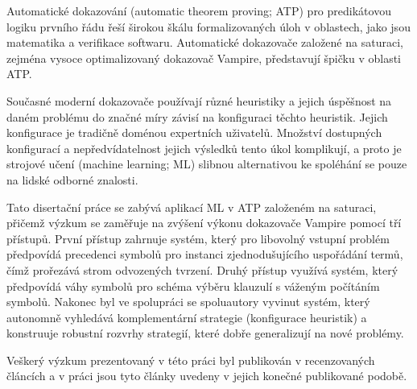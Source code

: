 Automatické dokazování (automatic theorem proving; ATP) pro predikátovou logiku prvního řádu řeší širokou škálu formalizovaných úloh v oblastech, jako jsou matematika a verifikace softwaru. Automatické dokazovače založené na saturaci, zejména vysoce optimalizovaný dokazovač Vampire, představují špičku v oblasti ATP.

Současné moderní dokazovače používají různé heuristiky a jejich úspěšnost na daném problému do značné míry závisí na konfiguraci těchto heuristik. Jejich konfigurace je tradičně doménou expertních uživatelů. Množství dostupných konfigurací a nepředvídatelnost jejich výsledků tento úkol komplikují, a proto je strojové učení (machine learning; ML) slibnou alternativou ke spoléhání se pouze na lidské odborné znalosti.

Tato disertační práce se zabývá aplikací ML v ATP založeném na saturaci, přičemž výzkum se zaměřuje na zvýšení výkonu dokazovače Vampire pomocí tří přístupů. První přístup zahrnuje systém, který pro libovolný vstupní problém předpovídá precedenci symbolů pro instanci zjednodušujícího uspořádání termů, čímž prořezává strom odvozených tvrzení. Druhý přístup využívá systém, který předpovídá váhy symbolů pro schéma výběru klauzulí s váženým počítáním symbolů. Nakonec byl ve spolupráci se spoluautory vyvinut systém, který autonomně vyhledává komplementární strategie (konfigurace heuristik) a konstruuje robustní rozvrhy strategií, které dobře generalizují na nové problémy.

Veškerý výzkum prezentovaný v této práci byl publikován v recenzovaných článcích a v práci jsou tyto články uvedeny v jejich konečné publikované podobě.
